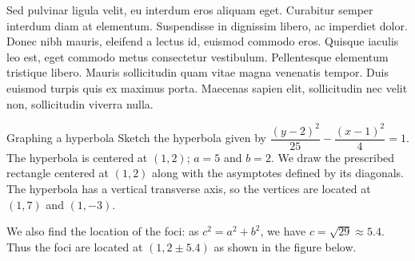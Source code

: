 \documentclass[12pt]{article}
\begin{document}
Sed pulvinar ligula velit, eu interdum eros aliquam eget. 
Curabitur semper interdum diam at elementum. Suspendisse in 
dignissim libero, ac imperdiet dolor. Donec nibh mauris, eleifend 
a lectus id, euismod commodo eros. Quisque iaculis leo est, eget 
commodo metus consectetur vestibulum. Pellentesque elementum 
tristique libero. Mauris sollicitudin quam vitae magna venenatis 
tempor. Duis euismod turpis quis ex maximus porta. Maecenas sapien 
elit, sollicitudin nec velit non, sollicitudin viverra nulla.

\begin{example}{Graphing a hyperbola}
	{
		Sketch the hyperbola given by 
		$\dfrac{(y-2)^2}{25}-\dfrac{(x-1)^2}{4}=1$.
	}
	The hyperbola is centered at $(1, 2)$; $a=5$ and $b=2$. We draw 
	the prescribed rectangle centered at $(1, 2)$ along with the 
	asymptotes defined by its diagonals. The hyperbola has a vertical 
	transverse axis, so the vertices are located at $(1, 7)$ and 
	$(1, -3)$. 

	\hspace*{20pt}We also find the location of the foci: as $c^2 = a^2 + b^2$, we 
	have $c = \sqrt{29} \approx 5.4$. Thus the foci are located at $(1, 2 \pm 5.4)$ 
	as shown in the figure below.
	\begin{center}
				
	\end{center}
\end{example}
\end{document}
